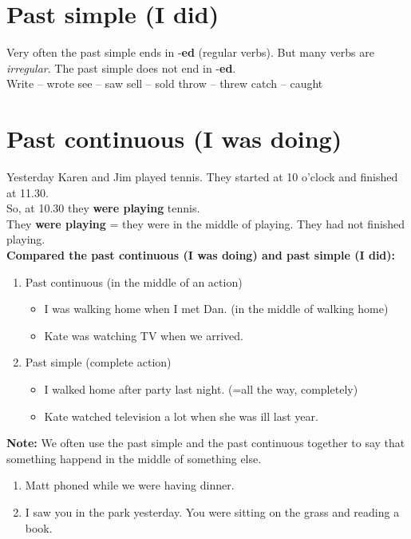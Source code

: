 \documentclass[12pt]{article}
\begin{document}
    \section{Past simple (I did)}
    Very often the past simple ends in -\textbf{ed} (regular verbs). But many verbs are \textit{irregular}.
    The past simple does not end in -\textbf{ed}.\\
    Write -- wrote \quad see -- saw \quad sell -- sold \quad throw -- threw \quad catch -- caught

    \section{Past continuous (I was doing)}
    Yesterday Karen and Jim played tennis. They started at 10 o'clock and finished at 11.30.\\
    So, at 10.30 they \textbf{were playing} tennis.\\

    They \textbf{were playing} = they were in the middle of playing. They had not finished playing.\\

    \textbf{Compared the past continuous (I was doing) and past simple (I did):}
    \begin{enumerate}
        \item Past continuous (in the middle of an action)
        \begin{itemize}
            \item I was walking home when I met Dan. (in the middle of walking home)
            \item Kate was watching TV when we arrived.
        \end{itemize}

        \item Past simple (complete action)
        \begin{itemize}
            \item I walked home after party last night. (=all the way, completely)
            \item Kate watched television a lot when she was ill last year.
        \end{itemize}
    \end{enumerate}

    \textbf{Note:} We often use the past simple and the past continuous together to say that something happend
    in the middle of something else.
    \begin{enumerate}
        \item Matt phoned while we were having dinner.
        \item I saw you in the park yesterday. You were sitting on the grass and reading a book.
    \end{enumerate}
\end{document}
